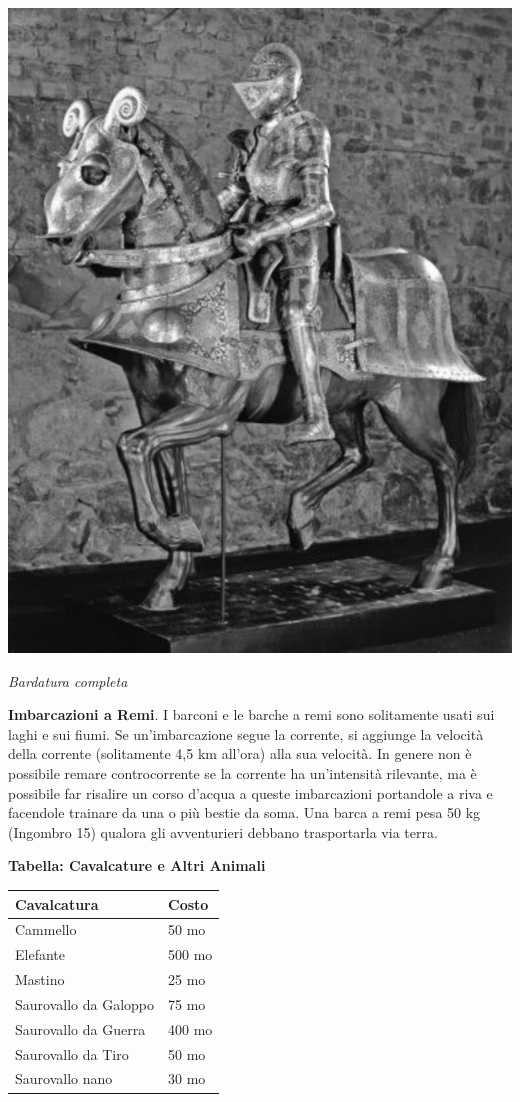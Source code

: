 \begin{multicols}{2}
\begin{center}
	\includegraphics[width=0.8\linewidth]{immagini/bardatura.png}

	\emph{Bardatura completa}
\end{center}

\textbf{Imbarcazioni a Remi}\hypertarget{Barca a remi}{}\label{Barca a remi}. I barconi e le barche a remi sono solitamente usati sui laghi e sui fiumi. Se un'imbarcazione segue la corrente, si aggiunge la velocità della corrente (solitamente 4,5 km all'ora) alla sua velocità. In genere non è possibile remare controcorrente se la corrente ha un'intensità rilevante, ma è possibile far risalire un corso d'acqua a queste imbarcazioni portandole a riva e facendole trainare da una o più bestie da soma. Una barca a remi pesa 50 kg (Ingombro 15) qualora gli avventurieri debbano trasportarla via terra.

\medskip

\textbf{Tabella: Cavalcature e Altri Animali}\label{costicavalcature}

\noindent\begin{tabularx}{\linewidth}{Xl}
\toprule
\textbf{Cavalcatura}&\textbf{Costo}\\
\toprule
Cammello&50 mo\\
Elefante&500 mo\\
Mastino&25 mo\\
Saurovallo da Galoppo&75 mo\\
Saurovallo da Guerra&400 mo\\
Saurovallo da Tiro&50 mo\\
Saurovallo nano&30 mo
\end{tabularx}


\end{multicols}
